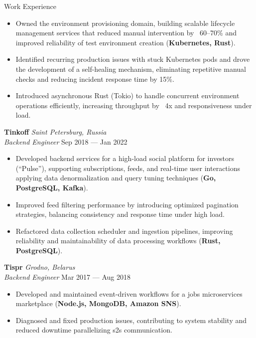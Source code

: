 \documentclass{resume} %
\begin{document}
\begin{rSection}{Work Experience}
\begin{itemize}
\item Owned the environment provisioning domain, building scalable lifecycle management services that reduced manual intervention by ~60--70\% and improved reliability of test environment creation (\textbf{Kubernetes, Rust}).

\item Identified recurring production issues with stuck Kubernetes pods and drove the development of a self-healing mechanism, eliminating repetitive manual checks and reducing incident response time by 15\%.

\item Introduced asynchronous Rust (Tokio) to handle concurrent environment operations efficiently, increasing throughput by ~4x and responsiveness under load.
\end{itemize}

\textbf{Tinkoff} \hfill \textit{Saint Petersburg, Russia} \\
{\large \textit{Backend Engineer}} \hfill Sep 2018 --- Jan 2022
\begin{itemize}
\item Developed backend services for a high-load social platform for investors (“Pulse”), supporting subscriptions, feeds, and real-time user interactions applying data denormalization and query tuning techniques (\textbf{Go, PostgreSQL, Kafka}).

\item Improved feed filtering performance by introducing optimized pagination strategies, balancing consistency and response time under high load.

\item Refactored data collection scheduler and ingestion pipelines, improving reliability and maintainability of data processing workflows (\textbf{Rust, PostgreSQL}).

\end{itemize}

\textbf{Tispr} \hfill \textit{Grodno, Belarus} \\
{\large \textit{Backend Engineer}} \hfill Mar 2017 --- Aug 2018
\begin{itemize}
\item Developed and maintained event-driven workflows for a jobs microservices marketplace (\textbf{Node.js, MongoDB, Amazon SNS}).

\item Diagnosed and fixed production issues, contributing to system stability and reduced downtime parallelizing s2s communication.
\end{itemize}


\end{rSection}
\end{document}
